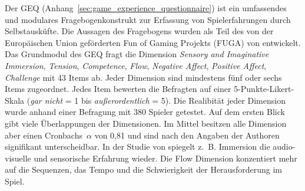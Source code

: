 Der \ac{GEQ} (Anhang~\ref{sec:game_experience_questionnaire}) ist ein umfassendes und modulares Fragebogenkonstrukt zur Erfassung von Spielerfahrungen durch Selbstausküfte. Die Aussagen des Fragebogens wurden als Teil des von der Europäischen Union geförderten Fun of Gaming Projekts (FUGA) von \citet{Ijsselsteijn2008} entwickelt. Das Grundmodul des \ac{GEQ} fragt die 
Dimension \emph{Sensory and Imaginative Immersion}, \emph{Tension}, \emph{Competence}, \emph{Flow}, \emph{Negative Affect}, \emph{Positive Affect}, \emph{Challenge} mit 43 Items ab. Jeder Dimension sind mindestens fünf oder sechs Items zugeordnet. Jedes Item bewerten die Befragten auf einer 5-Punkte-Likert-Skala (\emph{gar nicht} = 1 bis \emph{außerordentlich} = 5). Die Realibität jeder Dimension wurde anhand einer Befragung mit 380 Spieler getestet. Auf dem ersten Blick gibt viele Überlappungen der Dimensionen. Im Mittel besitzen alle Dimension aber einen Cronbachs~$\alpha$ von 0,81 und sind nach den Angaben der Authoren signifikant unterscheidbar. In der Studie von \citet{Nacke2008} spiegelt z.~B. Immersion die audio-visuelle und sensorische Erfahrung wieder. Die Flow Dimension konzentiert mehr auf die Sequenzen, das Tempo und die Schwierigkeit der Herausforderung im Spiel.

